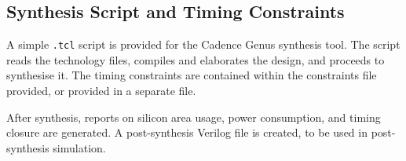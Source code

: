 \subsection{Synthesis Script and Timing Constraints}

A simple {\tt .tcl} script is provided for the Cadence Genus synthesis tool. The
script reads the technology files, compiles and elaborates the design, and
proceeds to synthesise it. The timing constraints are contained within the
constraints file provided, or provided in a separate file.

After synthesis, reports on silicon area usage, power consumption, and timing
closure are generated. A post-synthesis Verilog file is created, to be used in
post-synthesis simulation.


